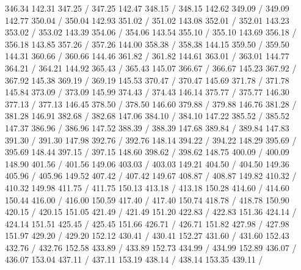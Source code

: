 { 346.34 142.31 347.25 /
 347.25 142.47 348.15 /
 348.15 142.62 349.09 /
 349.09 142.77 350.04 /
 350.04 142.93 351.02 /
 351.02 143.08 352.01 /
 352.01 143.23 353.02 /
 353.02 143.39 354.06 /
 354.06 143.54 355.10 /
 355.10 143.69 356.18 /
 356.18 143.85 357.26 /
 357.26 144.00 358.38 /
 358.38 144.15 359.50 /
 359.50 144.31 360.66 /
 360.66 144.46 361.82 /
 361.82 144.61 363.01 /
 363.01 144.77 364.21 /
 364.21 144.92 365.43 /
 365.43 145.07 366.67 /
 366.67 145.23 367.92 /
 367.92 145.38 369.19 /
 369.19 145.53 370.47 /
 370.47 145.69 371.78 /
 371.78 145.84 373.09 /
 373.09 145.99 374.43 /
 374.43 146.14 375.77 /
 375.77 146.30 377.13 /
 377.13 146.45 378.50 /
 378.50 146.60 379.88 /
 379.88 146.76 381.28 /
 381.28 146.91 382.68 /
 382.68 147.06 384.10 /
 384.10 147.22 385.52 /
 385.52 147.37 386.96 /
 386.96 147.52 388.39 /
 388.39 147.68 389.84 /
 389.84 147.83 391.30 /
 391.30 147.98 392.76 /
 392.76 148.14 394.22 /
 394.22 148.29 395.69 /
 395.69 148.44 397.15 /
 397.15 148.60 398.62 /
 398.62 148.75 400.09 /
 400.09 148.90 401.56 /
 401.56 149.06 403.03 /
 403.03 149.21 404.50 /
 404.50 149.36 405.96 /
 405.96 149.52 407.42 /
 407.42 149.67 408.87 /
 408.87 149.82 410.32 /
 410.32 149.98 411.75 /
 411.75 150.13 413.18 /
 413.18 150.28 414.60 /
 414.60 150.44 416.00 /
 416.00 150.59 417.40 /
 417.40 150.74 418.78 /
 418.78 150.90 420.15 /
 420.15 151.05 421.49 /
 421.49 151.20 422.83 /
 422.83 151.36 424.14 /
 424.14 151.51 425.45 /
 425.45 151.66 426.71 /
 426.71 151.82 427.98 /
 427.98 151.97 429.20 /
 429.20 152.12 430.41 /
 430.41 152.27 431.60 /
 431.60 152.43 432.76 /
 432.76 152.58 433.89 /
 433.89 152.73 434.99 /
 434.99 152.89 436.07 /
 436.07 153.04 437.11 /
 437.11 153.19 438.14 /
 438.14 153.35 439.11 /
}
